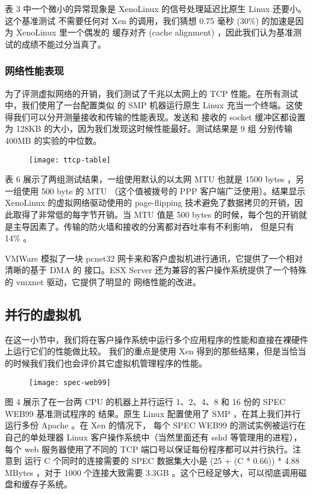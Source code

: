 表 3 中一个微小的异常现象是 XenoLinux 的信号处理延迟比原生 Linux 还要小。这个基准测试
不需要任何对 Xen 的调用，我们猜想 0.75 毫秒 (30\%) 的加速是因为 XenoLinux 里一个偶发的
缓存对齐 (cache alignment) ，因此我们认为基准测试的成绩不能过分当真了。

\subsubsection{网络性能表现}

为了评测虚拟网络的开销，我们测试了千兆以太网上的 TCP 性能。在所有测试中，我们使用了一台配置类似
的 SMP 机器运行原生 Linux 充当一个终端。这使得我们可以分开测量接收和传输的性能表现。发送和
接收的 socket 缓冲区都设置为 128KB 的大小，因为我们发现这时候性能最好。测试结果是 9 组
分别传输 400MB 的实验的中位数。

\begin{figure}[h]
    \centering
    \texttt{[image: ttcp-table]}
\end{figure}

表 6 展示了两组测试结果，一组使用默认的以太网 MTU 也就是 1500 bytes ，另一组使用 500 byte
的 MTU （这个值被拨号的 PPP 客户端广泛使用）。结果显示 XenoLinux 的虚拟网络驱动使用的
page-flipping 技术避免了数据拷贝的开销，因此取得了非常低的每字节开销。当 MTU 值是
500 bytes 的时候，每个包的开销就是主导因素了。传输的防火墙和接收的分离都对吞吐率有不利影响，
但是只有 14\% 。

VMWare 模拟了一块 pcnet32 网卡来和客户虚拟机进行通讯，它提供了一个相对清晰的基于 DMA 的
接口。ESX Server 还为兼容的客户操作系统提供了一个特殊的 vmxnet 驱动，它提供了明显的
网络性能的改进。

\subsection{并行的虚拟机}

在这一小节中，我们将在客户操作系统中运行多个应用程序的性能和直接在裸硬件上运行它们的性能做比较。
我们的重点是使用 Xen 得到的那些结果，但是当恰当的时候我们我们也会评价其它虚拟机管理程序的性能。

\begin{figure}[h]
    \centering
    \texttt{[image: spec-web99]}
\end{figure}

图 4 展示了在一台两 CPU 的机器上并行运行 1、2、4、8 和 16 份的 SPEC WEB99 基准测试程序的
结果。原生 Linux 配置使用了 SMP ，在其上我们并行运行多份 Apache 。在 Xen 的情况下，
每个 SPEC WEB99 的测试实例被运行在自己的单处理器 Linux 客户操作系统中（当然里面还有 sshd
等管理用的进程），每个 web 服务器使用了不同的 TCP 端口号以保证每份程序都可以并行执行。注意到
运行 C 个同时的连接需要的 SPEC 数据集大小是 (25 + (C * 0.66)) * 4.88 MBytes ，对于
1000 个连接大致需要 3.3GB 。这个已经足够大，可以彻底调用磁盘和缓存子系统。

